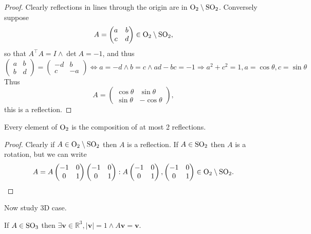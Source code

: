 \documentclass[a4paper]{article}
\begin{document}
\begin{proof}
  Clearly reflections in lines through the origin are in $ \mathrm{O}_2
  \setminus \mathrm{SO}_2 $. Conversely suppose
  \[
    A=
    \begin{pmatrix}
      a&b\\c&d
    \end{pmatrix}\in \mathrm{O}_2 \setminus \mathrm{SO}_2,
  \]
  so that $ A^\top A=I \land \det A=-1 $, and thus
  \[
    \begin{pmatrix}
      a&b\\b&d
    \end{pmatrix}=
    \begin{pmatrix}
      -d&b\\c&-a
    \end{pmatrix} \Longleftrightarrow a=-d \land b=c \land ad-bc=-1
    \Longrightarrow a^2+c^2=1, a=\cos \theta,c=\sin \theta
  \]
  Thus
  \[
    A =
    \begin{pmatrix}
      \cos \theta& \sin \theta\\
      \sin \theta& -\cos \theta
    \end{pmatrix},
  \]
  this is a reflection.
\end{proof}
\begin{corollary}\label{col:7.20}
  Every element of $\mathrm{O}_2$ is the composition of at most 2 reflections.
\end{corollary}
\begin{proof}
  Clearly if $ A\in  \mathrm{O}_2 \setminus \mathrm{SO}_2$ then $A$ is a reflection.
  If $ A\in \mathrm{SO}_2 $ then $A$ is a rotation, but we can write
  \[
    A=A
    \begin{pmatrix}
      -1&0\\
      0&1
    \end{pmatrix}
    \begin{pmatrix}
      -1&0\\
      0&1
    \end{pmatrix}: A
    \begin{pmatrix}
      -1&0\\
      0&1
    \end{pmatrix},
    \begin{pmatrix}
      -1&0\\
      0&1
    \end{pmatrix}\in \mathrm{O}_2 \setminus \mathrm{SO}_2.
  \]
\end{proof}
Now study 3D case.
\begin{theorem}\label{thm:7.21}
  If $ A\in \mathrm{SO}_3 $ then $ \exists \mathbf{v}\in \mathbb{R}^{3},
  |\mathbf{v}|=1 \land  A\mathbf{v}=\mathbf{v} $.
\end{theorem}
\end{document}
